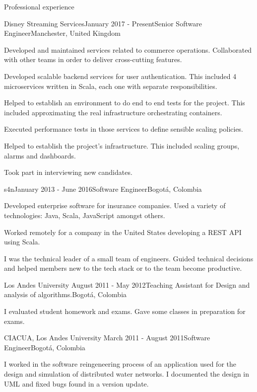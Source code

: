 \documentclass{resume} %
\def\uniandes{Los Andes University }
\begin{document}
\begin{rSection}{Professional experience}

\begin{rSubsection}{Disney Streaming Services}{January 2017 - Present}{Senior Software Engineer}{Manchester, United Kingdom}
\item Developed and maintained services related to commerce operations. Collaborated with other teams in order to deliver cross-cutting features.
\item Developed scalable backend services for user authentication. This included 4 microservices written in Scala, each one with separate responsibilities.
\item Helped to establish an environment to do end to end tests for the project. This included approximating the real infrastructure orchestrating containers.
\item Executed performance tests in those services to define sensible scaling policies.
\item Helped to establish the project's infrastructure. This included scaling groups, alarms and dashboards.
\item Took part in interviewing new candidates.
\end{rSubsection}

\begin{rSubsection}{s4n}{January 2013 - June 2016}{Software Engineer}{Bogot\'a, Colombia}
\item Developed enterprise software for insurance companies. Used a variety of technologies: Java, Scala, JavaScript amongst others.
\item Worked remotely for a company in the United States developing a REST API using Scala.
\item I was the technical leader of a small team of engineers. Guided technical decisions and helped members new to the tech stack or to the team become productive.
\end{rSubsection}


\begin{rSubsection}{\uniandes}{August 2011 - May 2012}{Teaching Assistant for Design and analysis of algorithms.}{Bogot\'a, Colombia}
\item I evaluated student homework and exams. Gave some classes in preparation for exams.
\end{rSubsection}


\begin{rSubsection}{CIACUA, \uniandes}{March 2011 - August 2011}{Software Engineer}{Bogot\'a, Colombia}
\item I worked in the software reingeneering process of an application used for the design and simulation of distributed water networks. I documented the design in UML and fixed bugs found in a version update.
\end{rSubsection}

\end{rSection}
\end{document}
